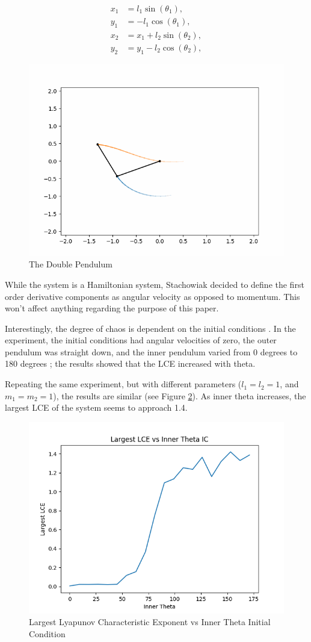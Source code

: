 \documentclass{article}
\begin{document}
\begin{align}
    x_1 &= l_1 \sin(\theta_1), \nonumber \\
    y_1 &= - l_1 \cos(\theta_1), \nonumber \\
    x_2 &= x_1 + l_2 \sin(\theta_2), \nonumber \\
    y_2 &= y_1 - l_2 \cos(\theta_2), \label{eq:doub_pend_endpoints}
\end{align}

\begin{figure}[H]
    \centering
    \includegraphics[width=.5\linewidth]{images/example_doub_pend.png}
    \caption{The Double Pendulum}
    \label{fig:doub_pend}
\end{figure}

While the system is a Hamiltonian system, Stachowiak decided to define the
first order derivative components as angular velocity as opposed to momentum.
This won't affect anything regarding the purpose of this paper.

Interestingly, the degree of chaos is dependent on the initial conditions
\cite{levien1993double}. In the experiment, the initial conditions had
angular velocities of zero, the outer pendulum was straight down, and the
inner pendulum varied from 0 degrees to 180 degrees \cite{levien1993double};
the results showed that the LCE increased with theta.

Repeating the same experiment, but with different parameters ($l_1 = l_2 =
1$, and $m_1 = m_2 = 1$), the results are similar (see Figure
\ref{fig:doub_pend_energy}). As inner theta increases, the largest LCE of the
system seems to approach 1.4. %

\begin{figure}[H]
    \centering
    \includegraphics[width=.5\linewidth]{images/chaos_vs_energy_in_doub_pend.png}
    \caption{Largest Lyapunov Characteristic Exponent vs Inner Theta Initial Condition}
    \label{fig:doub_pend_energy}
\end{figure}
\end{document}
